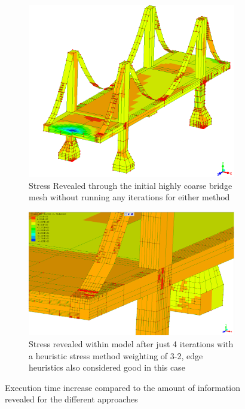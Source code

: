 \begin{figure}[H]
\centering
\begin{subfigure}{.5\textwidth}
  \centering
  \includegraphics[width=0.9\linewidth]{../Graphics/BridgeCrossLoadingStress/Hybrid-best-3-2.png}
  \caption{Stress Revealed through the initial highly coarse bridge mesh without running any iterations for either method}
  \label{fig:sub1}
\end{subfigure}%
\begin{subfigure}{.5\textwidth}
  \centering
  \includegraphics[width=0.9\linewidth]{../Graphics/BridgeCrossLoadingStress/BridgeCrossLoadingStress6-3-2.png}
  \caption{Stress revealed within model after just 4 iterations with a heuristic stress method weighting of 3-2, edge heuristics also considered good in this case}
  \label{fig:sub2}
\end{subfigure}
\label{fig:test}
  \caption{Execution time increase compared to the amount of information revealed for the different approaches}
 \end{figure}



